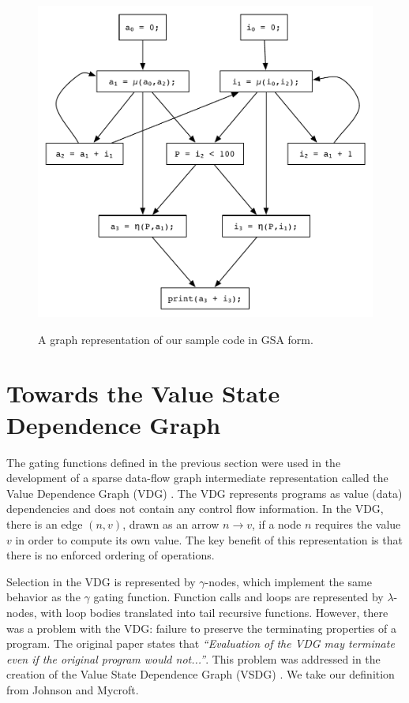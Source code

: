 \begin{figure}
\centering
\includegraphics[scale=0.55]{gsa-example.pdf}
\label{fig: gsa-graph-example}
\caption{A graph representation of our sample code in GSA form.}
\end{figure}


\section{Towards the Value State Dependence Graph}

The gating functions defined in the previous section were used in the development of a sparse data-flow graph intermediate representation called the Value Dependence Graph (VDG) \cite{177907}. The VDG represents programs as value (data) dependencies and does not contain any control flow information. In the VDG, there is an edge $(n,v)$, drawn as an arrow $n\rightarrow v$, if a node $n$ requires the value $v$ in order to compute its own value. The key benefit of this representation is that there is no enforced ordering of operations. 

Selection in the VDG is represented by $\gamma$-nodes, which implement the same behavior as the $\gamma$ gating function. Function calls and loops are represented by $\lambda$-nodes, with loop bodies translated into tail recursive functions. However, there was a problem with the VDG: failure to preserve the terminating properties of a program. The original paper states that \textit{``Evaluation of the VDG may terminate even if the original program would not...''}. This problem was addressed in the creation of the Value State Dependence Graph (VSDG) \cite{UCAM-CL-TR-607}. We take our definition from Johnson and Mycroft. \cite{Johnson_combinedcode}

